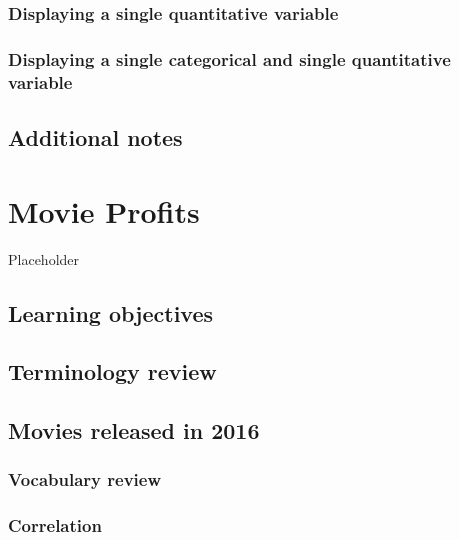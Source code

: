 \documentclass[
]{report}
\begin{document}
\hypertarget{displaying-a-single-quantitative-variable}{%
\subsection{Displaying a single quantitative variable}\label{displaying-a-single-quantitative-variable}}

\hypertarget{displaying-a-single-categorical-and-single-quantitative-variable}{%
\subsection{Displaying a single categorical and single quantitative variable}\label{displaying-a-single-categorical-and-single-quantitative-variable}}

\hypertarget{additional-notes}{%
\section{Additional notes}\label{additional-notes}}

\hypertarget{movie-profits}{%
\chapter{Movie Profits}\label{movie-profits}}

Placeholder

\hypertarget{learning-objectives}{%
\section{Learning objectives}\label{learning-objectives}}

\hypertarget{terminology-review}{%
\section{Terminology review}\label{terminology-review}}

\hypertarget{movies-released-in-2016}{%
\section{Movies released in 2016}\label{movies-released-in-2016}}

\hypertarget{vocabulary-review}{%
\subsection{Vocabulary review}\label{vocabulary-review}}

\hypertarget{correlation}{%
\subsection{Correlation}\label{correlation}}
\end{document}
